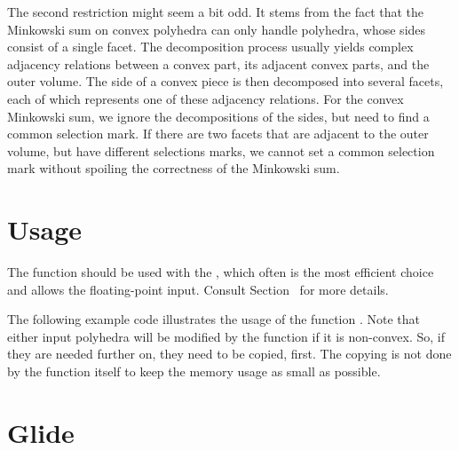 The second restriction might seem a bit odd. It stems from the fact
that the Minkowski sum on convex polyhedra can only handle polyhedra,
whose sides consist of a single facet. The decomposition process
usually yields complex adjacency relations between a convex part, its
adjacent convex parts, and the outer volume. The side of a convex
piece is then decomposed into several facets, each of which represents
one of these adjacency relations. For the convex Minkowski sum, we
ignore the decompositions of the sides, but need to find a common
selection mark. If there are two facets that are adjacent to the outer
volume, but have different selections marks, we cannot set a common
selection mark without spoiling the correctness of the Minkowski sum.

\section{Usage}

The function  should be used with the
, which often is
the most efficient choice and allows the floating-point input. Consult
Section~\label{sectionNef_3IO} for more details.

The following example code illustrates the usage of the function
. Note that either input polyhedra will be
modified by the function if it is non-convex. So, if they are needed
further on, they need to be copied, first. The copying is not done by
the function itself to keep the memory usage as small as possible.


\section{Glide}

